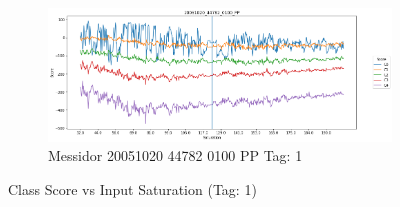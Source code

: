\begin{figure}[ht!]
\begin{subfigure}[b]{ 0.85\textwidth}
		\centering
		\includegraphics[width=\textwidth]{Figures/chapter_stability/20051020_44782_0100_PP/s/scores.png}
		\caption{Messidor 20051020 44782 0100 PP Tag: 1}		
	\end{subfigure}
	\hfill 
	\caption[Score vs Saturation (Tag: 1)]{Class Score vs Input Saturation (Tag: 1)}  
	\label{sta:fig:sat1} 
\end{figure}

